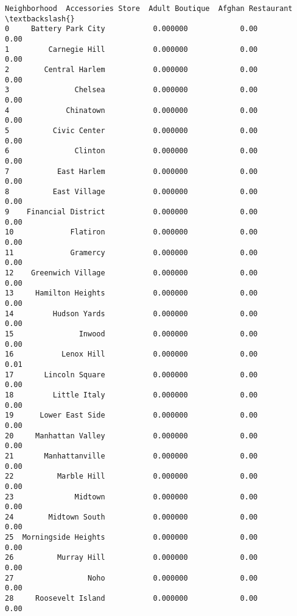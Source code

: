 \documentclass[11pt]{article}
\makeatletter
\newcommand{\boxspacing}{\kern\kvtcb@left@rule\kern\kvtcb@boxsep}
\newcommand{\prompt}[4]{
        \ttfamily\llap{{\color{#2}[#3]:\hspace{3pt}#4}}\vspace{-\baselineskip}
    }
\makeatother
\begin{document}
            \begin{tcolorbox}[breakable, size=fbox, boxrule=.5pt, pad at break*=1mm, opacityfill=0]
\prompt{Out}{outcolor}{59}{\boxspacing}
\begin{Verbatim}[commandchars=\\\{\}]
           Neighborhood  Accessories Store  Adult Boutique  Afghan Restaurant  \textbackslash{}
0     Battery Park City           0.000000            0.00               0.00
1         Carnegie Hill           0.000000            0.00               0.00
2        Central Harlem           0.000000            0.00               0.00
3               Chelsea           0.000000            0.00               0.00
4             Chinatown           0.000000            0.00               0.00
5          Civic Center           0.000000            0.00               0.00
6               Clinton           0.000000            0.00               0.00
7           East Harlem           0.000000            0.00               0.00
8          East Village           0.000000            0.00               0.00
9    Financial District           0.000000            0.00               0.00
10             Flatiron           0.000000            0.00               0.00
11             Gramercy           0.000000            0.00               0.00
12    Greenwich Village           0.000000            0.00               0.00
13     Hamilton Heights           0.000000            0.00               0.00
14         Hudson Yards           0.000000            0.00               0.00
15               Inwood           0.000000            0.00               0.00
16           Lenox Hill           0.000000            0.00               0.01
17       Lincoln Square           0.000000            0.00               0.00
18         Little Italy           0.000000            0.00               0.00
19      Lower East Side           0.000000            0.00               0.00
20     Manhattan Valley           0.000000            0.00               0.00
21       Manhattanville           0.000000            0.00               0.00
22          Marble Hill           0.000000            0.00               0.00
23              Midtown           0.000000            0.00               0.00
24        Midtown South           0.000000            0.00               0.00
25  Morningside Heights           0.000000            0.00               0.00
26          Murray Hill           0.000000            0.00               0.00
27                 Noho           0.000000            0.00               0.00
28     Roosevelt Island           0.000000            0.00               0.00

\end{Verbatim}
\end{tcolorbox}
\end{document}
